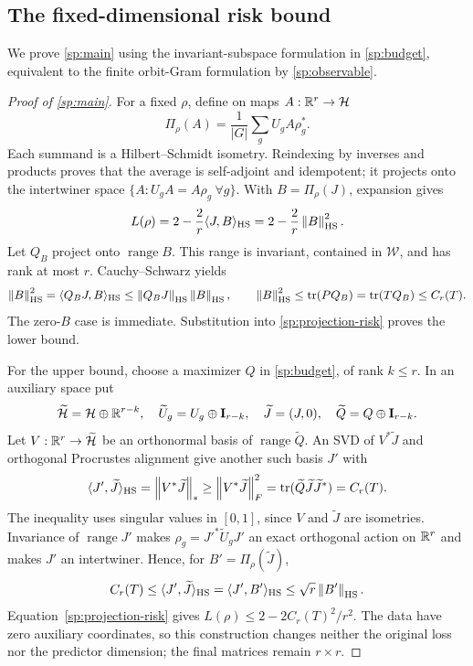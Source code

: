 \subsection{The fixed-dimensional risk bound}
\label{sp:main-proof}
We prove \cref{sp:main} using the invariant-subspace formulation in \cref{sp:budget}, equivalent to the finite orbit-Gram formulation by \cref{sp:observable}.
\begin{proof}[Proof of \cref{sp:main}]
For a fixed $\rho$, define on maps $A:\mathbb{R}^r\to\mathcal H$
\[
 \Pi_\rho(A)=\frac1{|G|}\sum_gU_gA\rho_g^*.
\]
Each summand is a Hilbert--Schmidt isometry. Reindexing by inverses and products proves that the average is self-adjoint and idempotent; it projects onto the intertwiner space $\{A:U_gA=A\rho_g\ \forall g\}$. With $B=\Pi_\rho(J)$, expansion gives
\begin{equation}
 L(\rho)=2-\frac2r\langle J,B\rangle_{\mathrm{HS}}
        =2-\frac2r\left\lVert B\right\rVert_{\mathrm{HS}}^2.
 \label{sp:projection-risk}
\end{equation}
Let $Q_B$ project onto $\operatorname{range}B$. This range is invariant, contained in $\mathcal W$, and has rank at most $r$. Cauchy--Schwarz yields
\[
 \left\lVert B\right\rVert_{\mathrm{HS}}^2=\langle Q_BJ,B\rangle_{\mathrm{HS}}
 \le\left\lVert Q_BJ\right\rVert_{\mathrm{HS}}\left\lVert B\right\rVert_{\mathrm{HS}},\qquad
 \left\lVert B\right\rVert_{\mathrm{HS}}^2\le\operatorname{tr}(PQ_B)
 =\operatorname{tr}(TQ_B)\le C_r(T).
\]
The zero-$B$ case is immediate. Substitution into \cref{sp:projection-risk} proves the lower bound.

For the upper bound, choose a maximizer $Q$ in \cref{sp:budget}, of rank $k\le r$. In an auxiliary space put
\[
 \widetilde{\mathcal H}=\mathcal H\oplus\mathbb{R}^{r-k},\quad
 \widetilde U_g=U_g\oplus\mathbf{I}_{r-k},\quad
 \widetilde J=(J,0),\quad \widetilde Q=Q\oplus\mathbf{I}_{r-k}.
\]
Let $V:\mathbb{R}^r\to\widetilde{\mathcal H}$ be an orthonormal basis of $\operatorname{range}\widetilde Q$. An SVD of $V^*\widetilde J$ and orthogonal Procrustes alignment give another such basis $J'$ with
\[
 \langle J',\widetilde J\rangle_{\mathrm{HS}}
 =\left\lVert V^*\widetilde J\right\rVert_*
 \ge\left\lVert V^*\widetilde J\right\rVert_F^2
 =\operatorname{tr}(\widetilde Q\widetilde J\widetilde J^*)=C_r(T).
\]
The inequality uses singular values in $[0,1]$, since $V$ and $\widetilde J$ are isometries. Invariance of $\operatorname{range}J'$ makes $\rho_g=J'^*\widetilde U_gJ'$ an exact orthogonal action on $\mathbb{R}^r$ and makes $J'$ an intertwiner. Hence, for $B'=\Pi_\rho(\widetilde J)$,
\[
 C_r(T)\le\langle J',\widetilde J\rangle_{\mathrm{HS}}
 =\langle J',B'\rangle_{\mathrm{HS}}
 \le\sqrt r\left\lVert B'\right\rVert_{\mathrm{HS}}.
\]
Equation~\eqref{sp:projection-risk} gives $L(\rho)\le2-2C_r(T)^2/r^2$. The data have zero auxiliary coordinates, so this construction changes neither the original loss nor the predictor dimension; the final matrices remain $r\times r$.
\end{proof}

